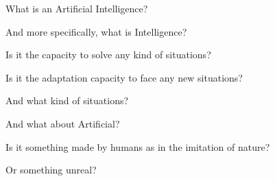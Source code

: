\documentclass{article}
\makeatletter
\newenvironment{chapquote}[2][2em]
  {\setlength{\@tempdima}{#1}%
   \def\chapquote@author{#2}%
   \parshape 1 \@tempdima \dimexpr\textwidth-2\@tempdima\relax%
   \itshape}
  {\smallskip\par\normalfont\hfill--\ \chapquote@author\hspace*{\@tempdima}\par\bigskip}
\makeatother
\begin{document}
%

\bigskip
\noindent What is an Artificial Intelligence? 

\noindent And more specifically, what is Intelligence?

\noindent Is it the capacity to solve any kind of situations?

\noindent Is it the adaptation capacity to face any new situations?

\noindent And what kind of situations?

\noindent And what about Artificial?

\noindent Is it something made by humans as in the imitation of nature?

\noindent Or something unreal?

\bigskip
\end{document}
